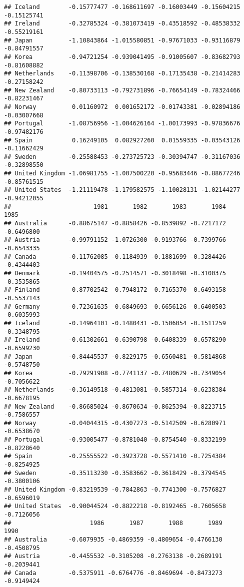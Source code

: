 \documentclass[
]{article}
\begin{document}
\begin{verbatim}
## Iceland        -0.15777477 -0.168611697 -0.16003449 -0.15604215 -0.15125741
## Ireland        -0.32785324 -0.381073419 -0.43518592 -0.48538332 -0.55219161
## Japan          -1.10843864 -1.015580851 -0.97671033 -0.93116879 -0.84791557
## Korea          -0.94721254 -0.939041495 -0.91005607 -0.83682793 -0.81608882
## Netherlands    -0.11398706 -0.138530168 -0.17135438 -0.21414283 -0.27158242
## New Zealand    -0.80733113 -0.792731896 -0.76654149 -0.78324466 -0.82231467
## Norway          0.01160972  0.001652172 -0.01743381 -0.02894186 -0.03007668
## Portugal       -1.08756956 -1.004626164 -1.00173993 -0.97836676 -0.97482176
## Spain           0.16249105  0.082927260  0.01559335 -0.03543126 -0.11662429
## Sweden         -0.25588453 -0.273725723 -0.30394747 -0.31167036 -0.32898550
## United Kingdom -1.06981755 -1.007500220 -0.95683446 -0.88677246 -0.85761515
## United States  -1.21119478 -1.179582575 -1.10028131 -1.02144277 -0.94212055
##                       1981       1982       1983       1984       1985
## Australia      -0.88675147 -0.8858426 -0.8539892 -0.7217172 -0.6496800
## Austria        -0.99791152 -1.0726300 -0.9193766 -0.7399766 -0.6543335
## Canada         -0.11762085 -0.1184939 -0.1881699 -0.3284426 -0.4344403
## Denmark        -0.19404575 -0.2514571 -0.3018498 -0.3100375 -0.3535865
## Finland        -0.87702542 -0.7948172 -0.7165370 -0.6493158 -0.5537143
## Germany        -0.72361635 -0.6849693 -0.6656126 -0.6400503 -0.6035993
## Iceland        -0.14964101 -0.1480431 -0.1506054 -0.1511259 -0.3348795
## Ireland        -0.61302661 -0.6390798 -0.6408339 -0.6578290 -0.6599230
## Japan          -0.84445537 -0.8229175 -0.6560481 -0.5814868 -0.5748750
## Korea          -0.79291908 -0.7741137 -0.7480629 -0.7349054 -0.7056622
## Netherlands    -0.36149518 -0.4813081 -0.5857314 -0.6238384 -0.6678195
## New Zealand    -0.86685024 -0.8670634 -0.8625394 -0.8223715 -0.7586557
## Norway         -0.04044315 -0.4307273 -0.5142509 -0.6280971 -0.6538670
## Portugal       -0.93005477 -0.8781040 -0.8754540 -0.8332199 -0.8228640
## Spain          -0.25555522 -0.3923728 -0.5571410 -0.7254384 -0.8254925
## Sweden         -0.35113230 -0.3583662 -0.3618429 -0.3794545 -0.3800106
## United Kingdom -0.83219539 -0.7842863 -0.7741300 -0.7576827 -0.6596019
## United States  -0.90044524 -0.8822218 -0.8192465 -0.7605658 -0.7126056
##                      1986       1987       1988       1989       1990
## Australia      -0.6079935 -0.4869359 -0.4809654 -0.4766130 -0.4508795
## Austria        -0.4455532 -0.3105208 -0.2763138 -0.2689191 -0.2039441
## Canada         -0.5375911 -0.6764776 -0.8469694 -0.8473273 -0.9149424

\end{verbatim}
\end{document}

